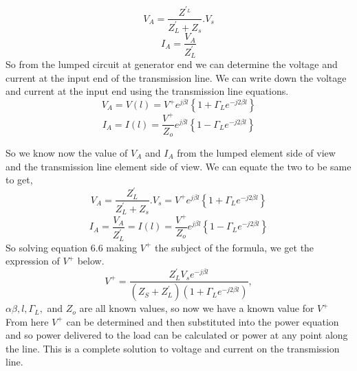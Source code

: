 \begin{equation}
V_A = \frac{Z^{'_L}}{Z^{'}_L + Z_s} . V_s
\end{equation}
\begin{equation}
I_A = \frac{V_A}{Z^{'}_L}
\end{equation} 
So from the lumped circuit at generator end we can determine the voltage and current at the input end of the transmission line. We can write down the voltage and current at the input end using the transmission line equations.
\begin{equation*} 
V_A= V(l) = V^+ e^{j\beta l} \left\lbrace 1 + \Gamma_L e^{-j2\beta l} \right\rbrace 
\end{equation*} 
\begin{equation*}
I_A = I(l) = \frac{V^+}{Z_o} e^{j\beta l} \left\lbrace 1 - \Gamma_L e^{-j2\beta l} \right\rbrace
\end{equation*}

So we know now the value of $V_A$ and $I_A$ from the lumped element side of view and the transmission line element side of view. We can equate the two to be same to get,
\begin{equation} 
V_A = \frac{Z^{'}_L}{Z^{'}_L + Z_s} . V_s = V^+ e^{j\beta l} \left\lbrace 1 + \Gamma_L e^{-j2\beta l} \right\rbrace 
\end{equation}
\begin{equation}
I_A = \frac{V_A}{Z^{'}_L} = I(l) = \frac{V^+}{Z_o} e^{j\beta l} \left\lbrace 1 - \Gamma_L e^{-j2\beta l} \right\rbrace
\end{equation}
So solving equation $6.6$ making $V^{+}$ the subject of the formula, we get the expression of $V^+$ below. 
\begin{equation} 
V^+ = \frac{Z^{'}_L V_s e^{-j\beta l}}{(Z_S + Z^{'}_L)(1 + \Gamma_L e^{-j2\beta l })}, 
\end{equation}
$\alpha \beta , l  , \Gamma_L,$ and $Z_o$ are all known values, so now we have a known value for $V^+$\\

From here $V^+$ can be determined and then substituted into the power equation and so power delivered to the load can be calculated or power at any point along the line. This is a complete solution to voltage and current on the transmission line.

